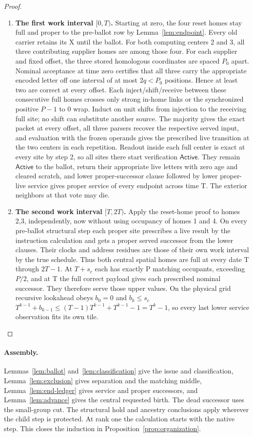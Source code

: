 \begin{proof}
\begin{enumerate}
\item \textbf{The first work interval \([0,T)\).} Starting at zero, the four reset homes stay full and proper to the pre-ballot row by Lemma~\ref{lem:endpoint}. Every old carrier retains its X until the ballot. For both computing centers 2 and 3, all three contributing supplier homes are among those four. For each supplier and fixed offset, the three stored homologous coordinates are spaced \(P_0\) apart. Nominal acceptance at time zero certifies that all three carry the appropriate encoded letter off one interval of at most \(2q<P_0\) positions. Hence at least two are correct at every offset. Each inject/shift/receive between these consecutive full homes crosses only strong in-home links or the synchronized positive \(P- 1\) to 0 wrap. Induct on unit shifts from injection to the receiving full site; no shift can substitute another source. The majority gives the exact packet at every offset, all three parsers recover the respective served input, and evaluation with the frozen operands gives the prescribed live transition at the two centers in each repetition. Readout inside each full center is exact at every site by step 2, so all sites there start verification \(\mathsf{Active}\). They remain \(\mathsf{Active}\) to the ballot, return their appropriate live letters with zero age and cleared scratch, and lower proper-successor clause followed by lower proper-live service gives proper service of every endpoint across time T. The exterior neighbors at that vote may die.
\item \textbf{The second work interval \([T,2T)\).} Apply the reset-home proof to homes 2,3, independently, now without using occupancy of homes 1 and 4. On every pre-ballot structural step each proper site prescribes a live result by the instruction calculation and gets a proper served successor from the lower clauses. Their clocks and address residues are those of their own work interval by the true schedule. Thus both central spatial homes are full at every date T through \(2T- 1\). At \(T+s_c\) each has exactly P matching occupants, exceeding \(P/2\), and at T the full correct payload gives each prescribed nominal successor. They therefore serve those upper values. On the physical grid recursive lookahead obeys \(b_0=0\) and \(b_k\le s_c\) \(T^{k- 1}+b_{k- 1}\le (T- 1)T^{k- 1}+T^{k- 1}- 1=T^k- 1\), so every last lower service observation fits its own tile.
\end{enumerate}

\end{proof}

\paragraph{Assembly.} Lemmas~\ref{lem:ballot} and~\ref{lem:classification} give the issue and classification, Lemma~\ref{lem:exclusion} gives separation and the matching middle, Lemma~\ref{lem:end-ledger} gives service and proper successors, and Lemma~\ref{lem:advance} gives the central requested birth. The dead successor uses the small-group cut. The structural hold and ancestry conclusions apply wherever the child step is protected. At rank one the calculation starts with the native step. This closes the induction in Proposition~\ref{prop:organization}.
